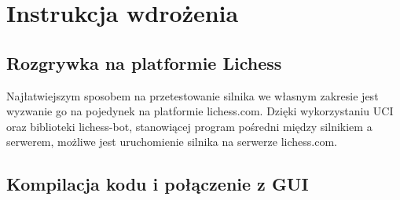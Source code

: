 \chapter{Instrukcja wdrożenia}
\label{ch:instrukcja-wdrozenia}

\section{Rozgrywka na platformie Lichess}
\label{sec:rozgrywka-na-platformie-lichess}
Najłatwiejszym sposobem na przetestowanie silnika we własnym zakresie jest wyzwanie go na pojedynek na platformie lichess.com.
Dzięki wykorzystaniu UCI oraz biblioteki lichess-bot, stanowiącej program pośredni między silnikiem a serwerem, możliwe jest uruchomienie silnika na serwerze lichess.com.

\section{Kompilacja kodu i połączenie z GUI}
\label{sec:kompilacja-kodu-i-polaczenie-z-gui}